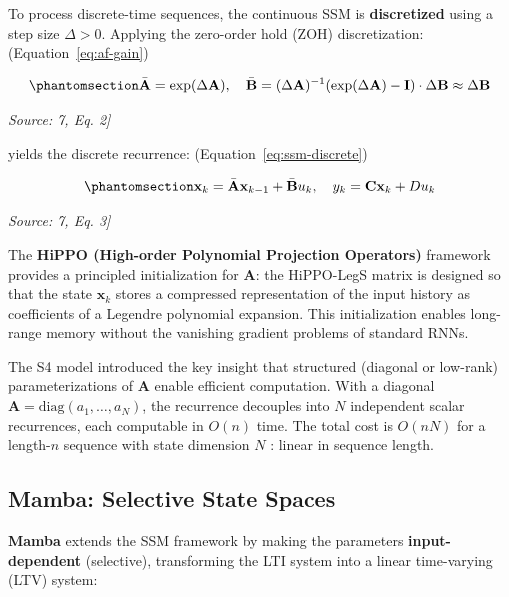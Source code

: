To process discrete-time sequences, the continuous SSM is \textbf{discretized} using a step size \(\Delta > 0\). Applying the zero-order hold (ZOH) discretization: (Equation~\ref{eq:af-gain})

\begin{equation}\protect\phantomsection\label{eq:ssm-zoh}{\bar{\mathbf{A}} = \exp(\Delta \mathbf{A}), \quad \bar{\mathbf{B}} = (\Delta \mathbf{A})^{-1}(\exp(\Delta \mathbf{A}) - \mathbf{I}) \cdot \Delta \mathbf{B} \approx \Delta \mathbf{B}
}\end{equation} \par{\small\textit{Source: \cite{Laneman2004CooperativeDiversity}7, Eq. 2]}}

yields the discrete recurrence: (Equation~\ref{eq:ssm-discrete})

\begin{equation}\protect\phantomsection\label{eq:ssm-discrete}{\mathbf{x}_k = \bar{\mathbf{A}} \mathbf{x}_{k-1} + \bar{\mathbf{B}} u_k, \quad y_k = \mathbf{C} \mathbf{x}_k + D u_k
}\end{equation} \par{\small\textit{Source: \cite{Laneman2004CooperativeDiversity}7, Eq. 3]}}

The \textbf{HiPPO (High-order Polynomial Projection Operators)} framework provides a principled initialization for \(\mathbf{A}\): the HiPPO-LegS matrix is designed so that the state \(\mathbf{x}_k\) stores a compressed representation of the input history as coefficients of a Legendre polynomial expansion. This initialization enables long-range memory without the vanishing gradient problems of standard RNNs.

The S4 model \cite{GuGoelRe2022SSM} introduced the key insight that structured (diagonal or low-rank) parameterizations of \(\mathbf{A}\) enable efficient computation. With a diagonal \(\mathbf{A} = \text{diag}(a_1, \dots, a_N)\), the recurrence decouples into \(N\) independent scalar recurrences, each computable in \(O(n)\) time. The total cost is \(O(nN)\) for a length-\(n\) sequence with state dimension \(N\) : linear in sequence length.

\subsection{Mamba: Selective State Spaces}\label{sec:mamba-selective-state-spaces}

\textbf{Mamba} \cite{GuDao2024Mamba} extends the SSM framework by making the parameters \textbf{input-dependent} (selective), transforming the LTI system into a linear time-varying (LTV) system:

